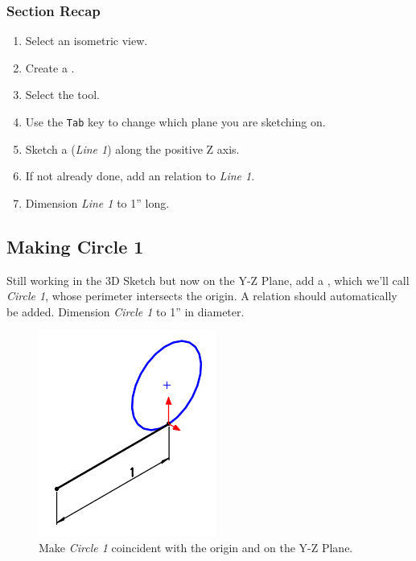 \subsubsection{Section Recap}

\begin{enumerate}
\item{} Select an isometric view.
\item{} Create a .
\item{} Select the  tool.
\item{} Use the \texttt{Tab} key to change which plane you are sketching on.
\item{} Sketch a  (\emph{Line 1}) along the positive Z axis.
\item{} If not already done, add an  relation to \emph{Line 1}.
\item{} Dimension \emph{Line 1} to 1'' long.
\end{enumerate}

\subsection{Making Circle 1}

\label{sec:making-circle-1}
Still working in the 3D Sketch but now on the Y-Z Plane, add a , which we'll
call \emph{Circle 1}, whose
perimeter intersects the origin. A  relation should
automatically be
added. Dimension \emph{Circle 1} to 1'' in diameter.

\begin{figure}[H]
\begin{center}
\includegraphics{images/figures/Making-Circle-1.png}
\end{center}
\caption{Make \emph{Circle 1} coincident with the origin and on the Y-Z Plane.
\label{making-circle-1}}

\end{figure}

